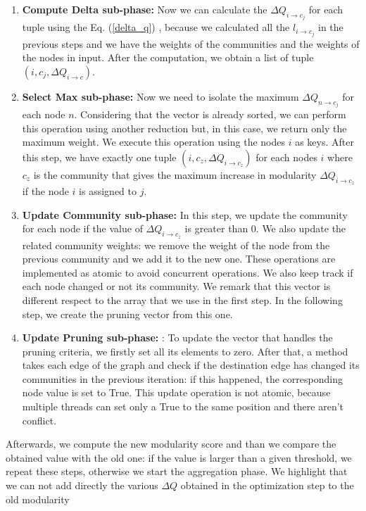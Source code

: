 \begin{enumerate}
	\item \textbf{Compute Delta sub-phase:} Now we can calculate the $\Delta Q_{i\rightarrow c_j}$ for each tuple using the Eq. (\ref{delta_q}) , because we calculated all the $l_{i\rightarrow c_j}$ in the previous steps and we have the weights of the communities and the weights of the nodes in input. After the computation, we obtain a list of tuple $(i, c_j, \Delta Q_{i\rightarrow c})$.
	
	\item \textbf{Select Max sub-phase:} Now we need to isolate the maximum $\Delta Q_{n\rightarrow c_j}$ for each node $n$. Considering that the vector is already sorted, we can perform this operation using another reduction but, in this case, we return only the maximum weight. We execute this operation using the nodes $i$ as keys.  After this step, we have exactly one tuple  $(i, c_z, \Delta Q_{i\rightarrow c_z})$  for each nodes $i$ where $c_z$ is the community that gives the maximum increase in modularity $\Delta Q_{i\rightarrow c_z}$ if the node $i$ is assigned to $j$.
	
	\item \textbf{Update Community sub-phase:}\label{update_com} In this step, we update the community for each node if the value of $\Delta Q_{i\rightarrow c_z}$ is greater than 0. We also update the related community weights: we remove the weight of the node from the previous community and we add it to the new one. These operations are implemented as atomic to avoid concurrent operations.  We also keep track if each node changed or not its community. We remark that this
	vector is different respect to the array that we use in the first step. In the following step, we create the pruning vector from this one.

	
	\item \textbf{Update Pruning sub-phase:}\label{update_prun} : To update the vector that handles the pruning
	criteria, we firstly set all its elements to zero. After that, a method takes each
	edge of the graph and check if the destination edge has changed its communities
	in the previous iteration: if this happened, the corresponding node value is set
	to True. This update operation is not atomic, because multiple threads can
	set only a True to the same position and there aren’t conflict.

\end{enumerate}
Afterwards, we compute the new modularity score and than we compare the obtained value with the old one: if the value is larger than a given threshold, we repeat these steps, otherwise we start the aggregation phase. We highlight that we can not add directly the various $\Delta Q$ obtained in the optimization step to the old modularity
